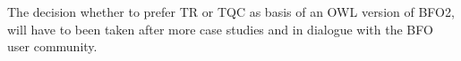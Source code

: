 

The decision whether to prefer TR or TQC as basis of an OWL version of BFO2, will 
have to been taken after more case studies and in dialogue with the BFO user community. 










   

